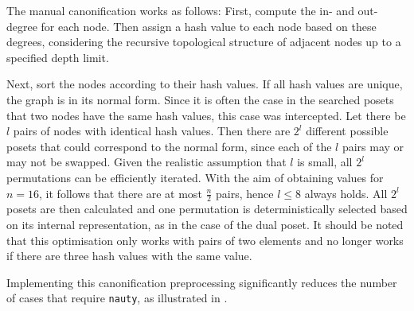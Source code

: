 \documentclass[twoside,leqno,twocolumn]{article}
\begin{document}
The manual canonification works as follows:
First, compute the in- and out-degree for each node.
Then assign a hash value to each node based on these degrees, considering the recursive topological structure of adjacent nodes up to a specified depth limit.

Next, sort the nodes according to their hash values.
If all hash values are unique, the graph is in its normal form.
Since it is often the case in the searched posets that two nodes have the same hash values, this case was intercepted.
Let there be $l$ pairs of nodes with identical hash values.
Then there are $2^l$ different possible posets that could correspond to the normal form, since each of the $l$ pairs may or may not be swapped.
Given the realistic assumption that $l$ is small, all $2^l$ permutations can be efficiently iterated.
With the aim of obtaining values for $n = 16$, it follows that there are at most $\frac{n}{2}$ pairs, hence $l \leq 8$ always holds.
All $2^l$ posets are then calculated and one permutation is deterministically selected based on its internal representation, as in the case of the dual poset.
It should be noted that this optimisation only works with pairs of two elements and no longer works if there are three hash values with the same value.

Implementing this canonification preprocessing significantly reduces the number of cases that require \texttt{nauty}, as illustrated in .

\begin{table}[!t]
  \renewcommand{\arraystretch}{1.1}
  \caption{Percentage of canonification requiring \texttt{nauty} for variable $n$ and $i$, where lower values are preferable.}
  \label{table:nauty-ratio}
  \centering
  \small
\end{table}
\end{document}
